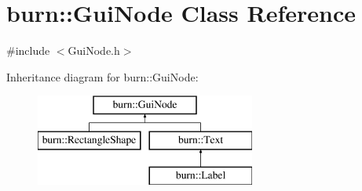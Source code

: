\hypertarget{classburn_1_1_gui_node}{\section{burn\-:\-:Gui\-Node Class Reference}
\label{classburn_1_1_gui_node}
}


{\ttfamily \#include $<$Gui\-Node.\-h$>$}

Inheritance diagram for burn\-:\-:Gui\-Node\-:\begin{figure}[H]
\begin{center}
\leavevmode
\includegraphics[height=3.000000cm]{classburn_1_1_gui_node}
\end{center}
\end{figure}
